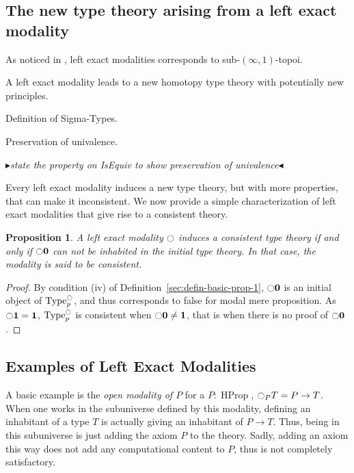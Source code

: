 \documentclass[conference]{IEEEtran}
\newtheorem{prop}[thm]{Proposition}
\newcommand{\mynote}[2]{
    \fbox{\bfseries\sffamily\scriptsize#1}
    {\small$\blacktriangleright$\textsf{\emph{#2}}$\blacktriangleleft$}~}
\newcommand\nt[1]{\mynote{NT}{#1}}
\DeclareMathOperator{\Type}{Type}
\DeclareMathOperator{\HProp}{HProp}
\newcommand{\modal}{\ensuremath{\ocircle}}
\newcommand \zero {\mathbf{0}}
\newcommand \one {\mathbf{1}}
\begin{document}
\subsection{The new type theory arising from a left exact modality}
\label{sec:new-type-theory}

As noticed in \cite{hottbook}, left exact modalities corresponds 
to sub-$(\infty,1)$-topoi.

A left exact modality leads to a new homotopy type theory with
potentially new principles. 

Definition of Sigma-Types. 

Preservation of univalence.

\nt{state the property on IsEquiv to show preservation of univalence}

Every left exact modality induces a new type theory, but with more
properties, that can make it inconsistent. We now provide a simple
characterization of left exact modalities that give rise to a
consistent theory.

\begin{prop}
  A left exact modality $\modal$ induces a consistent type theory if
  and only if $\modal \zero$ can not be inhabited in the initial type
  theory. In that case, the modality is said to be consistent.
\end{prop}
\begin{proof}
  By condition (iv) of Definition~\ref{sec:defin-basic-prop-1},
  $\modal \zero$ is an initial object of $\Type^\modal_p$, and thus
  corresponds to false for modal mere proposition.
  As $\modal \one = \one$, $\Type^\modal_p$ is consistent when
  $\modal \zero \neq \one$, that is when there is no proof of
  $\modal \zero$.
\end{proof}

\subsection{Examples of Left Exact Modalities}
\label{sec:examples-left-exact}

A basic example is the {\em open modality of $P$} for a $P:\HProp$,
$\modal_P T = P \to T$.  When one works in the subuniverse defined by
this modality, defining an inhabitant of a type $T$ is actually giving
an inhabitant of $P \to T$. Thus, being in this subuniverse is just
adding the axiom $P$ to the theory. Sadly, adding an axiom this way
does not add any computational content to $P$, thus is not completely
satisfactory.
\end{document}
